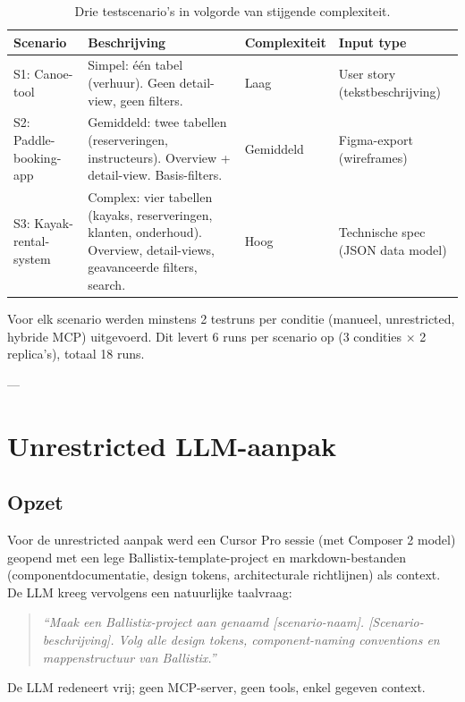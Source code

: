 \begin{table}[h]
\small
\begin{tabularx}{\textwidth}{|l|X|X|X|}
\hline
\textbf{Scenario} & \textbf{Beschrijving} & \textbf{Complexiteit} & \textbf{Input type} \\
\hline
S1: Canoe-tool & Simpel: één tabel (verhuur). Geen detail-view, geen filters. & Laag & User story (tekstbeschrijving) \\
\hline
S2: Paddle-booking-app & Gemiddeld: twee tabellen (reserveringen, instructeurs). Overview + detail-view. Basis-filters. & Gemiddeld & Figma-export (wireframes) \\
\hline
S3: Kayak-rental-system & Complex: vier tabellen (kayaks, reserveringen, klanten, onderhoud). Overview, detail-views, geavanceerde filters, search. & Hoog & Technische spec (JSON data model) \\
\hline
\end{tabularx}
\caption{Drie testscenario's in volgorde van stijgende complexiteit.}
\label{tab:scenarios}
\end{table}

Voor elk scenario werden minstens 2 testruns per conditie (manueel, unrestricted, hybride MCP) uitgevoerd. Dit levert 6 runs per scenario op (3 condities × 2 replica's), totaal 18 runs.

---

\section{Unrestricted LLM-aanpak}

\subsection{Opzet}

Voor de unrestricted aanpak werd een Cursor Pro sessie (met Composer 2 model) geopend met een lege Ballistix-template-project en markdown-bestanden (componentdocumentatie, design tokens, architecturale richtlijnen) als context. De LLM kreeg vervolgens een natuurlijke taalvraag:

\begin{quote}
\textit{``Maak een Ballistix-project aan genaamd [scenario-naam]. [Scenario-beschrijving]. Volg alle design tokens, component-naming conventions en mappenstructuur van Ballistix.''}
\end{quote}

De LLM redeneert vrij; geen MCP-server, geen tools, enkel gegeven context.

